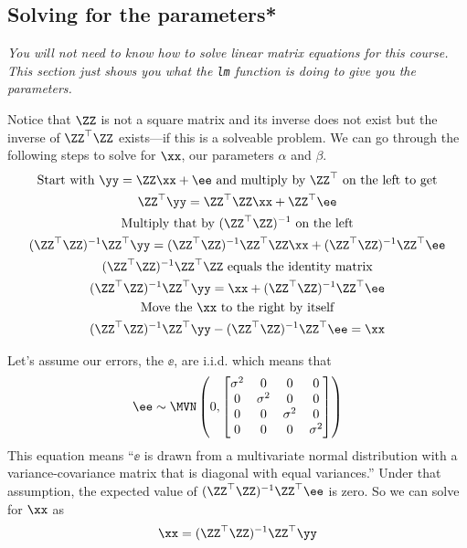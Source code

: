 \subsection{Solving for the parameters*}\label{solveform1}
\textit{You will not need to know how to solve linear matrix equations for this course.  This section just shows you what the \texttt{lm} function is doing to give you the parameters.}

Notice that $\ZZ$ is not a square matrix and its inverse does not exist but the inverse of $\ZZ^\top\ZZ$ exists---if this is a solveable problem.  We can go through the following steps to solve for $\xx$, our parameters $\alpha$ and $\beta$.
\begin{equation}\label{eqn:stack.loss.derivation}
\begin{gathered}
\text{Start with }\yy = \ZZ\xx + \ee \text{ and multiply by }\ZZ^\top\text{ on the left to get}\\
\ZZ^\top\yy = \ZZ^\top\ZZ\xx + \ZZ^\top\ee\\
\text{Multiply that by }(\ZZ^\top\ZZ)^{-1}\text{ on the left}\\
(\ZZ^\top\ZZ)^{-1}\ZZ^\top\yy = (\ZZ^\top\ZZ)^{-1}\ZZ^\top\ZZ\xx + (\ZZ^\top\ZZ)^{-1}\ZZ^\top\ee\\
(\ZZ^\top\ZZ)^{-1}\ZZ^\top\ZZ \text{ equals the identity matrix}\\
(\ZZ^\top\ZZ)^{-1}\ZZ^\top\yy = \xx + (\ZZ^\top\ZZ)^{-1}\ZZ^\top\ee\\
\text{Move the }\xx\text{ to the right by itself}\\
(\ZZ^\top\ZZ)^{-1}\ZZ^\top\yy - (\ZZ^\top\ZZ)^{-1}\ZZ^\top\ee = \xx
\end{gathered}
\end{equation}

Let's assume our errors, the $\ee$, are i.i.d. which means that
\begin{equation}
\ee \sim \MVN\begin{pmatrix}0,
\begin{bmatrix}
\sigma^2&0&0&0\\ 0&\sigma^2&0&0\\ 0&0&\sigma^2&0\\ 0&0&0&\sigma^2
\end{bmatrix}
\end{pmatrix}
\end{equation}
This equation means ``$\ee$ is drawn from a multivariate normal distribution with a variance-covariance matrix that is diagonal with equal variances.''
Under that assumption, the expected value of $(\ZZ^\top\ZZ)^{-1}\ZZ^\top\ee$ is zero.  So we can solve for $\xx$ as
$$\xx = (\ZZ^\top\ZZ)^{-1}\ZZ^\top\yy$$


